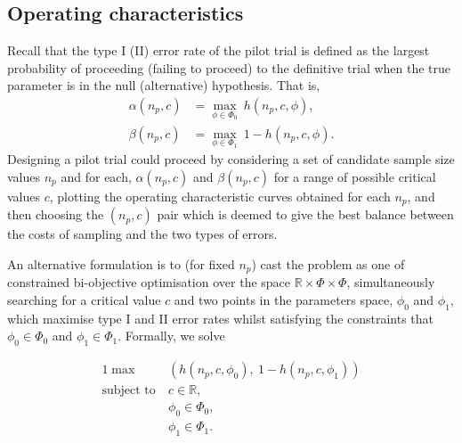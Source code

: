 \documentclass[AMA,STIX1COL]{WileyNJD-v2}
\begin{document}

\subsection{Operating characteristics}\label{sec:ocs}

Recall that the type I (II) error rate of the pilot trial is defined as the largest probability of proceeding (failing to proceed) to the definitive trial when the true parameter is in the null (alternative) hypothesis. That is, 
\begin{align*}
\alpha(n_p, c) &= \max_{\phi \in \Phi_0} ~ h(n_p, c, \phi) , \\
\beta(n_p, c) &= \max_{\phi \in \Phi_1}  ~ 1 - h(n_p, c, \phi).
\end{align*}
Designing a pilot trial could proceed by considering a set of candidate sample size values $n_p$ and for each, $\alpha(n_p, c)$ and $\beta(n_p, c)$ for a range of possible critical values $c$, plotting the operating characteristic curves obtained for each $n_p$, and then choosing the $(n_p, c)$ pair which is deemed to give the best balance between the costs of sampling and the two types of errors. 

An alternative formulation is to (for fixed $n_p$) cast the problem as one of constrained bi-objective optimisation over the space $\mathbb{R} \times \Phi \times \Phi$, simultaneously searching for a critical value $c$ and two points in the parameters space, $\phi_0$ and $\phi_1$, which maximise type I and II error rates whilst satisfying the constraints that $\phi_0 \in \Phi_0$ and $\phi_1 \in \Phi_1$. Formally, we solve

\begin{alignat}{1}\label{eqn:MO_opt}
\max ~ & \left( h(n_p, c, \phi_0) , ~ 1 - h(n_p, c, \phi_1)  \right) \\
\text{subject to} ~ & c \in \mathbb{R}, \nonumber \\ 
& \phi_0 \in \Phi_0, \nonumber  \\
& \phi_1 \in \Phi_1. \nonumber 
\end{alignat}
\end{document}
